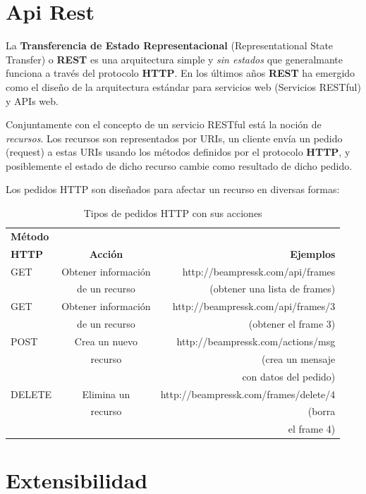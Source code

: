 	\section{Api Rest} %
	\label{sec:api_rest}
		La \textbf{Transferencia de Estado Representacional} (Representational State Transfer) o \textbf{REST} es una arquitectura simple y \textit{sin estados} que generalmante funciona a través del protocolo \textbf{HTTP}. En los últimos años \textbf{REST} ha emergido como el diseño de la arquitectura estándar para servicios web (Servicios RESTful) y APIs web.

		Conjuntamente con el concepto de un servicio RESTful está la noción de \textit{recursos}. Los recursos son representados por URIs, un cliente envía un pedido (request) a estas URIs usando los métodos definidos por el protocolo \textbf{HTTP}, y posiblemente el estado de dicho recurso cambie como resultado de dicho pedido.

		Los pedidos HTTP son diseñados para afectar un recurso en diversas formas:

		\begin{table}[tb]
			\caption{Tipos de pedidos HTTP con sus acciones}
			\label{tab:request}
			\centering
		
			\begin{tabular}{l|c|r}
			\hline
		
			\hline
			\textbf{Método} & & \\ 
			\textbf{HTTP} & \textbf{Acción} & \textbf{Ejemplos} \\
			\hline
				GET & Obtener información &  http://beampressk.com/api/frames \\ 
				& de un recurso & (obtener una lista de frames) \\
			\hline

			\hline
				GET & Obtener información &  http://beampressk.com/api/frames/3 \\ 
				& de un recurso & (obtener el frame 3) \\
			\hline

			\hline
				POST & Crea un nuevo &  http://beampressk.com/actions/msg \\ 
				& recurso & (crea un mensaje \\ 
				& &con datos del pedido)\\
			\hline

			\hline
				DELETE & Elimina un &  http://beampressk.com/frames/delete/4 \\ 
				& recurso & (borra \\ 
				& &el frame 4)\\
			\hline										
		
			\hline
			\end{tabular}
		\end{table}
		

	\section{Extensibilidad} %
	\label{sec:extensibilidad}
	





